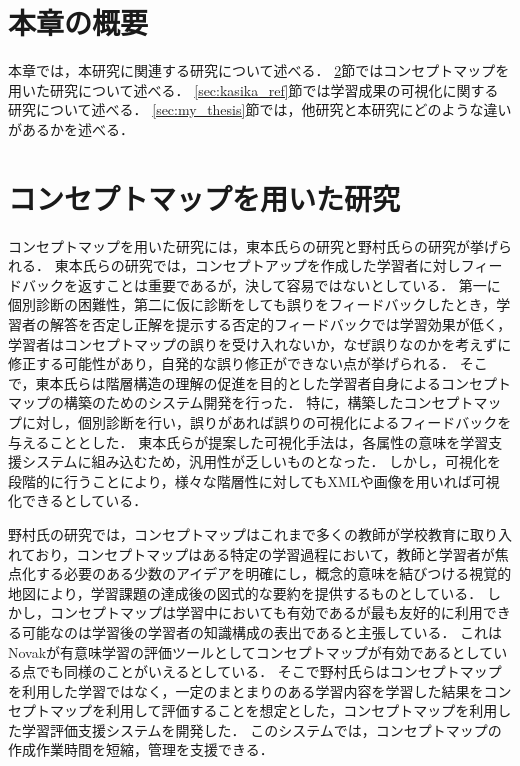 \section{本章の概要}
本章では，本研究に関連する研究について述べる．
\ref{sec:concept_ref}節ではコンセプトマップを用いた研究について述べる．
\ref{sec:kasika_ref}節では学習成果の可視化に関する研究について述べる．
\ref{sec:my_thesis}節では，他研究と本研究にどのような違いがあるかを述べる．

\section{コンセプトマップを用いた研究}\label{sec:concept_ref}
コンセプトマップを用いた研究には，東本氏らの研究\cite{toumoto}と野村氏らの研究\cite{nomura_manabu}が挙げられる．
東本氏らの研究では，コンセプトアップを作成した学習者に対しフィードバックを返すことは重要であるが，決して容易ではないとしている．
第一に個別診断の困難性，第二に仮に診断をしても誤りをフィードバックしたとき，学習者の解答を否定し正解を提示する否定的フィードバックでは学習効果が低く，学習者はコンセプトマップの誤りを受け入れないか，なぜ誤りなのかを考えずに修正する可能性があり，自発的な誤り修正ができない点が挙げられる．
そこで，東本氏らは階層構造の理解の促進を目的とした学習者自身によるコンセプトマップの構築のためのシステム開発を行った．
特に，構築したコンセプトマップに対し，個別診断を行い，誤りがあれば誤りの可視化によるフィードバックを与えることとした．
東本氏らが提案した可視化手法は，各属性の意味を学習支援システムに組み込むため，汎用性が乏しいものとなった．
しかし，可視化を段階的に行うことにより，様々な階層性に対してもXMLや画像を用いれば可視化できるとしている．

野村氏の研究では，コンセプトマップはこれまで多くの教師が学校教育に取り入れており，コンセプトマップはある特定の学習過程において，教師と学習者が焦点化する必要のある少数のアイデアを明確にし，概念的意味を結びつける視覚的地図により，学習課題の達成後の図式的な要約を提供するものとしている．
しかし，コンセプトマップは学習中においても有効であるが最も友好的に利用できる可能なのは学習後の学習者の知識構成の表出であると主張している．
これはNovak\cite{concept}\cite{novak}が有意味学習の評価ツールとしてコンセプトマップが有効であるとしている点でも同様のことがいえるとしている．
そこで野村氏らはコンセプトマップを利用した学習ではなく，一定のまとまりのある学習内容を学習した結果をコンセプトマップを利用して評価することを想定とした，コンセプトマップを利用した学習評価支援システムを開発した．
このシステムでは，コンセプトマップの作成作業時間を短縮，管理を支援できる．

